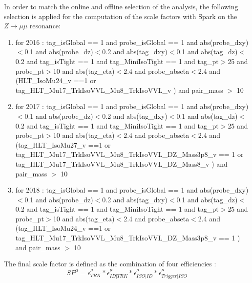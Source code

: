\documentclass{cernatlasnote}
\begin{document}
    In order to match the online and offline selection of the analysis, the following selection is applied for the computation of the scale factors with Spark on the $Z\rightarrow\mu\mu$ resonance:\\
    \begin{enumerate}
        \item for 2016 : tag\_isGlobal == 1 and probe\_isGlobal == 1 and abs(probe\_dxy)$<$0.1 and abs(probe\_dz)$<$0.2 and abs(tag\_dxy)$<$0.1 and abs(tag\_dz)$<$0.2 and tag\_isTight == 1 and tag\_MiniIsoTight == 1 and tag\_pt$>$25 and probe\_pt$>$10  and abs(tag\_eta)$<$2.4 and probe\_abseta$<$2.4 and (HLT\_IsoMu24\_v ==1 or \\ tag\_HLT\_Mu17\_TrkIsoVVL\_Mu8\_TrkIsoVVL\_v ) and pair\_mass $>$ 10
        
        \item for 2017 : tag\_isGlobal == 1 and probe\_isGlobal == 1 and abs(probe\_dxy)$<$0.1 and abs(probe\_dz)$<$0.2 and abs(tag\_dxy)$<$0.1 and abs(tag\_dz)$<$0.2 and tag\_isTight == 1 and tag\_MiniIsoTight == 1 and tag\_pt$>$25 and probe\_pt$>$10  and abs(tag\_eta)$<$2.4 and probe\_abseta$<$2.4 and (tag\_HLT\_IsoMu27\_v ==1 or \\ tag\_HLT\_Mu17\_TrkIsoVVL\_Mu8\_TrkIsoVVL\_DZ\_Mass3p8\_v == 1 or \\ tag\_HLT\_Mu17\_TrkIsoVVL\_Mu8\_TrkIsoVVL\_DZ\_Mass8\_v ) and pair\_mass $>$ 10
        
        \item for 2018 :  tag\_isGlobal == 1 and probe\_isGlobal == 1 and abs(probe\_dxy)$<$0.1 and abs(probe\_dz)$<$0.2 and abs(tag\_dxy)$<$0.1 and abs(tag\_dz)$<$0.2 and tag\_isTight == 1 and tag\_MiniIsoTight == 1 and tag\_pt$>$25 and probe\_pt$>$10  and abs(tag\_eta)$<$2.4 and probe\_abseta$<$2.4 and (tag\_HLT\_IsoMu24\_v ==1 or \\ tag\_HLT\_Mu17\_TrkIsoVVL\_Mu8\_TrkIsoVVL\_DZ\_Mass3p8\_v == 1  ) and pair\_mass $>$ 10
    \end{enumerate}

The final scale factor is defined as the combination of four efficiencies :
\begin{equation}
    SF^{\mu} = \epsilon^{\mu}_{TRK} *\epsilon^{\mu}_{ID|TRK} * \epsilon^{\mu}_{ISO|ID} * \epsilon^{\mu}_{Trigger|ISO}
\end{equation}
\end{document}

